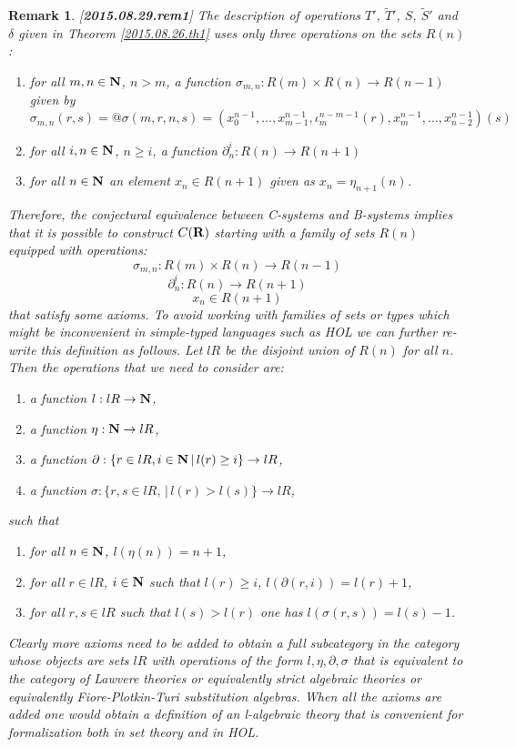 \documentclass[11pt]{article}
\newtheorem{remark}[proposition]{Remark}
\newcommand{\llabel}[1]{\label{#1}[{\bf #1}]}
\newcommand{\sr}{\rightarrow}
\newcommand{\nn}{{\bf N\rm}}
\newcommand{\nat}{\nn}
\newcommand{\rr}{{\bf R}}
\newcommand{\wt}{\widetilde}
\begin{document}
\begin{remark}\rm
\llabel{2015.08.29.rem1}
The description of operations $T'$, $\wt{T}'$, $S$, $\wt{S}'$ and $\delta$ given in Theorem \ref{2015.08.26.th1} uses only three operations on the sets $R(n)$:
%
\begin{enumerate}
\item for all $m,n\in\nat$, $n>m$, a function $\sigma_{m,n}:R(m)\times R(n)\sr R(n-1)$ given by 
%
$$\sigma_{m,n}(r,s)=@\sigma(m,r,n,s)=(x_0^{n-1},\dots,x_{m-1}^{n-1},\iota_m^{n-m-1}(r),x_{m}^{n-1},\dots,x_{n-2}^{n-1})(s)$$
%
\item for all $i,n\in\nat$, $n\ge i$, a function $\partial_n^i:R(n)\sr R(n+1)$ 
%
\item for all $n\in\nat$ an element $x_{n}\in R(n+1)$ given as $x_{n}=\eta_{n+1}(n)$.
\end{enumerate}
%
Therefore, the conjectural equivalence between C-systems and B-systems implies that it is possible to construct $C(\rr)$ starting with a family of sets $R(n)$ equipped with operations:
%
$$\sigma_{m,n}:R(m)\times R(n)\sr R(n-1)$$
$$\partial_n^i:R(n)\sr R(n+1)$$
$$x_{n}\in R(n+1)$$
%
that satisfy some axioms. To avoid working with families of sets or types which might be inconvenient in simple-typed languages such as HOL we can further re-write this definition as follows. Let $lR$ be the disjoint union of $R(n)$ for all $n$. Then the operations that we need to consider are:
%
\begin{enumerate}
\item a function $l:lR\sr\nat$,
\item a function $\eta:\nat\sr lR$,
\item a function $\partial:\{r\in lR, i\in\nat\,|\, l(r)\ge i\}\sr lR$,
\item a function $\sigma:\{r,s\in lR,\,|\,l(r)>l(s)\}\sr lR$,
\end{enumerate}
%
such that
%
\begin{enumerate}
\item for all $n\in\nat$, $l(\eta(n))=n+1$,
\item for all $r\in lR$, $i\in\nat $ such that $l(r)\ge i$, $l(\partial(r,i))=l(r)+1$,
\item for all $r,s\in lR$ such that $l(s)>l(r)$ one has $l(\sigma(r,s))=l(s)-1$.
\end{enumerate}
%
Clearly more axioms need to be added to obtain a full subcategory in the category whose objects are sets $lR$ with operations of the form $l,\eta,\partial,\sigma$ that is equivalent to the category of Lawvere theories or equivalently strict algebraic theories or equivalently Fiore-Plotkin-Turi substitution algebras. When all the axioms are added one would obtain a definition of an l-algebraic theory that is convenient for formalization both in set theory and in HOL. 
\end{remark}
\end{document}
